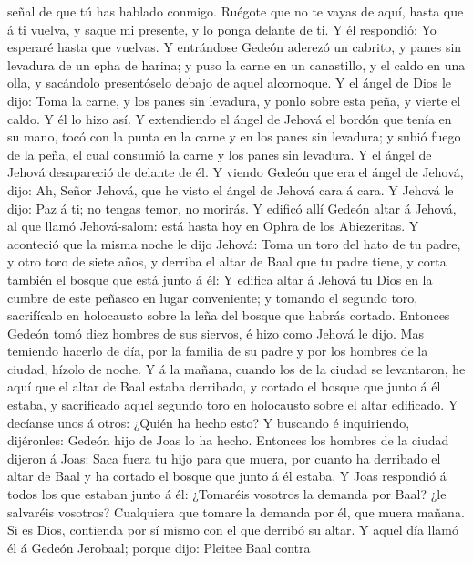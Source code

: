 señal de que tú has hablado conmigo.  Ruégote que no te
vayas de aquí, hasta que á ti vuelva, y saque mi presente, y lo ponga
delante de ti. Y él respondió: Yo esperaré hasta que vuelvas.
 Y entrándose Gedeón aderezó un cabrito, y panes sin
levadura de un epha de harina; y puso la carne en un canastillo, y el
caldo en una olla, y sacándolo presentóselo debajo de aquel alcornoque.
 Y el ángel de Dios le dijo: Toma la carne, y los panes sin
levadura, y ponlo sobre esta peña, y vierte el caldo. Y él lo hizo así.
 Y extendiendo el ángel de Jehová el bordón que tenía en su
mano, tocó con la punta en la carne y en los panes sin levadura; y subió
fuego de la peña, el cual consumió la carne y los panes sin levadura. Y
el ángel de Jehová desapareció de delante de él.  Y viendo
Gedeón que era el ángel de Jehová, dijo: Ah, Señor Jehová, que he visto
el ángel de Jehová cara á cara.  Y Jehová le dijo: Paz á
ti; no tengas temor, no morirás.  Y edificó allí Gedeón
altar á Jehová, al que llamó Jehová-salom: está hasta hoy en Ophra de
los Abiezeritas.  Y aconteció que la misma noche le dijo
Jehová: Toma un toro del hato de tu padre, y otro toro de siete años, y
derriba el altar de Baal que tu padre tiene, y corta también el bosque
que está junto á él:  Y edifica altar á Jehová tu Dios en
la cumbre de este peñasco en lugar conveniente; y tomando el segundo
toro, sacrifícalo en holocausto sobre la leña del bosque que habrás
cortado.  Entonces Gedeón tomó diez hombres de sus siervos,
é hizo como Jehová le dijo. Mas temiendo hacerlo de día, por la familia
de su padre y por los hombres de la ciudad, hízolo de noche.
 Y á la mañana, cuando los de la ciudad se levantaron, he
aquí que el altar de Baal estaba derribado, y cortado el bosque que
junto á él estaba, y sacrificado aquel segundo toro en holocausto sobre
el altar edificado.  Y decíanse unos á otros: ¿Quién ha
hecho esto? Y buscando é inquiriendo, dijéronles: Gedeón hijo de Joas lo
ha hecho. Entonces los hombres de la ciudad dijeron á Joas:
 Saca fuera tu hijo para que muera, por cuanto ha derribado
el altar de Baal y ha cortado el bosque que junto á él estaba.
 Y Joas respondió á todos los que estaban junto á él:
¿Tomaréis vosotros la demanda por Baal? ¿le salvaréis vosotros?
Cualquiera que tomare la demanda por él, que muera mañana. Si es Dios,
contienda por sí mismo con el que derribó su altar.  Y
aquel día llamó él á Gedeón Jerobaal; porque dijo: Pleitee Baal contra
